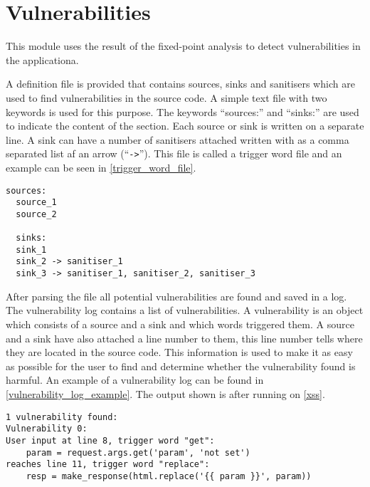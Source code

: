 \section{Vulnerabilities}
This module uses the result of the fixed-point analysis to detect vulnerabilities in the applicationa.

A definition file is provided that contains sources, sinks and sanitisers which are used to find vulnerabilities in the source code.
A simple text file with two keywords  is used for this purpose.
The keywords ``sources:'' and ``sinks:'' are used to indicate the content of the section.
Each source or sink is written on a separate line.
A sink can have a number of sanitisers attached written with as a comma separated list af an arrow (``\texttt{->}'').
This file is called a trigger word file and an example can be seen in \cref{trigger_word_file}.
\begin{lstlisting}[style=default, caption={How the trigger word file should be defined.}, label={trigger_word_file}]
  sources:
  source_1
  source_2

  sinks:
  sink_1
  sink_2 -> sanitiser_1
  sink_3 -> sanitiser_1, sanitiser_2, sanitiser_3
\end{lstlisting}

After parsing the file all potential vulnerabilities are found and saved in a log.
The vulnerability log contains a list of vulnerabilities.
A vulnerability is an object which consists of a source and a sink and which words triggered them.
A source and a sink have also attached a line number to them, this line number tells where they are located in the source code.
This information is used to make it as easy as possible for the user to find and determine whether the vulnerability found is harmful.
An example of a vulnerability log can be found in \cref{vulnerability_log_example}.
The output shown is after running \pyt{} on \cref{xss}.

\begin{lstlisting}[style=default, caption={An example of how the vulnerability log looks after it found one vulnerability.}, label={vulnerability_log_example}]
1 vulnerability found:
Vulnerability 0:
User input at line 8, trigger word "get": 
	param = request.args.get('param', 'not set')
reaches line 11, trigger word "replace": 
	resp = make_response(html.replace('{{ param }}', param))
\end{lstlisting}

